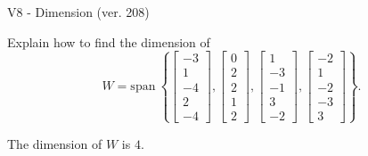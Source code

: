 \begin{exercise}
  \begin{exerciseTitle}V8 - Dimension (ver. 208)\end{exerciseTitle}
  \begin{exerciseStatement}
    Explain how to find the dimension of 
\[W=\mathrm{span}\ \left\{\left[\begin{array}{r}
-3 \\
1 \\
-4 \\
2 \\
-4
\end{array}\right] , \left[\begin{array}{r}
0 \\
2 \\
2 \\
1 \\
2
\end{array}\right] , \left[\begin{array}{r}
1 \\
-3 \\
-1 \\
3 \\
-2
\end{array}\right] , \left[\begin{array}{r}
-2 \\
1 \\
-2 \\
-3 \\
3
\end{array}\right]\right\}.\]



  \end{exerciseStatement}
  \begin{exerciseAnswer}
   The dimension of \(W\) is  \(4\).
  


  \end{exerciseAnswer}
\end{exercise}